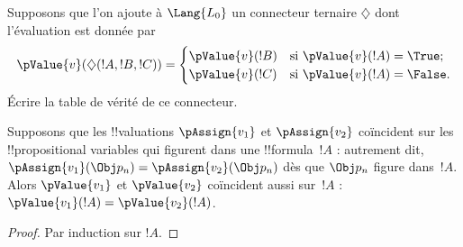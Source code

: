 \documentclass[../../../include/open-logic-section]{subfiles}
\begin{document}
\begin{prob}
Supposons que l'on ajoute à $\Lang{L_0}$ un connecteur ternaire
$\diamondsuit$ dont l'évaluation est donnée par
\begin{gather*}
  \pValue{v}(\diamondsuit( !A , !B , !C ) ) = \begin{cases}
    \pValue{v}( !B ) &
    \text{si $\pValue{v}(!A) = \True$;}\\
    \pValue{v}( !C ) &
    \text{si $\pValue{v}(!A) = \False $}.
  \end{cases}
\end{gather*}
Écrire la table de vérité de ce connecteur.
\end{prob}

\begin{thm}
Supposons que les !!{valuation}s $\pAssign{v_1}$ et $\pAssign{v_2}$
coïncident sur les !!{propositional variable}s qui figurent dans
une !!{formula}~$!A$ : autrement dit,
$\pAssign{v_1}(\Obj p_n) = \pAssign{v_2}(\Obj p_n)$ dès que
$\Obj p_n$ figure dans~$!A$. Alors $\pValue{v_1}$ et $\pValue{v_2}$
coïncident aussi sur~$!A$ :
$\pValue{v_1}(!A) = \pValue{v_2}(!A)$.
\end{thm}

\begin{proof}
Par induction sur $!A$.
\end{proof}
\end{document}
